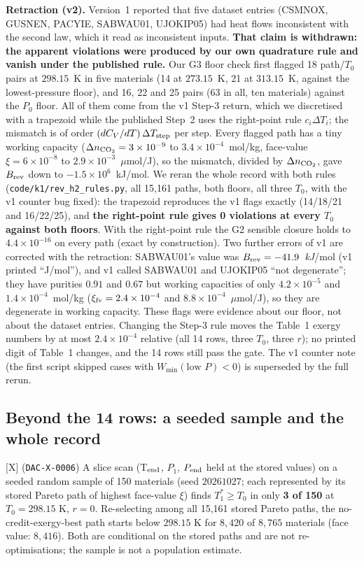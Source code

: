 \documentclass[10pt]{article}
\newcommand{\tier}[1]{\textsf{[#1]}}
\newcommand{\tX}{\tier{X}}
\newcommand{\id}[1]{\texttt{DAC-#1}}
\newcommand{\umolJ}{\ensuremath{\mu}mol/J}
\begin{document}
\textbf{Retraction (v2).} Version~1 reported that five dataset entries (CSMNOX, GUSNEN, PACYIE, SABWAU01, UJOKIP05) had heat flows inconsistent with the second law, which it read as inconsistent inputs. \textbf{That claim is withdrawn: the apparent violations were produced by our own quadrature rule and vanish under the published rule.} Our G3 floor check first flagged 18 path/$T_0$ pairs at $298.15$~K in five materials (14 at $273.15$~K, 21 at $313.15$~K, against the lowest-pressure floor), and 16, 22 and 25 pairs (63 in all, ten materials) against the $P_0$ floor. All of them come from the v1 Step-3 return, which we discretised with a trapezoid while the published Step~2 uses the right-point rule $c_i\Delta T_i$; the mismatch is of order $(dC_V/dT)\,\Delta T_{\rm step}$ per step. Every flagged path has a tiny working capacity ($\Delta n_{\rm CO_2}=3\times10^{-9}$ to $3.4\times10^{-4}$~mol/kg, face-value $\xi=6\times10^{-8}$ to $2.9\times10^{-3}$~\umolJ{}), so the mismatch, divided by $\Delta n_{\rm CO_2}$, gave $B_{\rm rev}$ down to $-1.5\times10^{6}$~kJ/mol. We reran the whole record with both rules (\texttt{code/k1/rev\_h2\_rules.py}, all 15,161 paths, both floors, all three $T_0$, with the v1 counter bug fixed): the trapezoid reproduces the v1 flags exactly (14/18/21 and 16/22/25), and \textbf{the right-point rule gives 0 violations at every $T_0$ against both floors}. With the right-point rule the G2 sensible closure holds to $4.4\times10^{-16}$ on every path (exact by construction). Two further errors of v1 are corrected with the retraction: SABWAU01's value was $B_{\rm rev}=-41.9$~\emph{kJ}/mol (v1 printed ``J/mol''), and v1 called SABWAU01 and UJOKIP05 ``not degenerate''; they have purities $0.91$ and $0.67$ but working capacities of only $4.2\times10^{-5}$ and $1.4\times10^{-4}$~mol/kg ($\xi_{\rm fv}=2.4\times10^{-4}$ and $8.8\times10^{-4}$~\umolJ{}), so they are degenerate in working capacity. These flags were evidence about our floor, not about the dataset entries.
Changing the Step-3 rule moves the Table~1 exergy numbers by at most $2.4\times10^{-4}$ relative (all 14 rows, three $T_0$, three $r$); no printed digit of Table~1 changes, and the 14 rows still pass the gate. The v1 counter note (the first script skipped cases with $W_{\min}(\text{low }P)<0$) is superseded by the full rerun.

\subsection{Beyond the 14 rows: a seeded sample and the whole record}
\tX{} (\id{X-0006}) A slice scan (T$_{\rm end}$, $P_1$, $P_{\rm end}$ held at the stored values) on a seeded random sample of 150 materials (seed $20261027$; each represented by its stored Pareto path of highest face-value $\xi$) finds $T_1^\ast\ge T_0$ in only \textbf{3 of 150} at $T_0=298.15$ K, $r=0$. Re-selecting among all 15,161 stored Pareto paths, the no-credit-exergy-best path starts below $298.15$ K for $8{,}420$ of $8{,}765$ materials (face value: $8{,}416$). Both are conditional on the stored paths and are not re-optimisations; the sample is not a population estimate.
\end{document}
